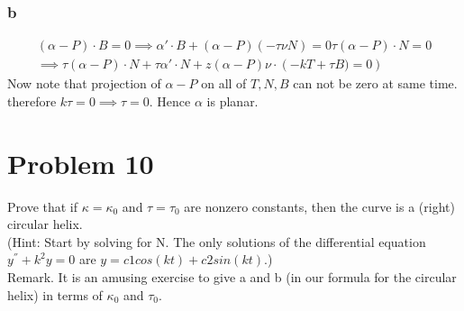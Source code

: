 \documentclass[
	12pt, %
]{fphw}
\theoremstyle{plain}
\begin{document}
\subsubsection*{b}
\begin{align*}
    \left( \alpha - P \right)\cdot B = 0 \implies \alpha'\cdot B + \left( \alpha - P \right) \left( -\tau\nu N\right)=0
    \tau \left( \alpha - P \right)\cdot N = 0\\
    \implies \tau\left( \alpha - P \right)\cdot N + \tau \alpha'\cdot N + z\left(\alpha-P\right)\nu \cdot \left(-kT + \tau B) = 0\right)
\end{align*}
Now note that projection of $\alpha - P$ on all of $T, N, B$ can not be zero at same time. therefore $k\tau=0 \implies \tau=0$. Hence $\alpha$ is planar.

\section*{Problem 10}
\begin{problem}
     Prove that if $\kappa = \kappa_{0}$ and $\tau = \tau_{0}$ are nonzero constants, then the curve is a (right) circular helix.\\
     (Hint: Start by solving for N. The only solutions of the differential equation $y^{''} + k^2 y = 0$ are $y = c1 cos(kt) + c2 sin(kt)$.)\\
     Remark. It is an amusing exercise to give a and b (in our formula for the circular helix) in terms
of $\kappa_{0}$ and $\tau_{0}$.
\end{problem}
\end{document}
